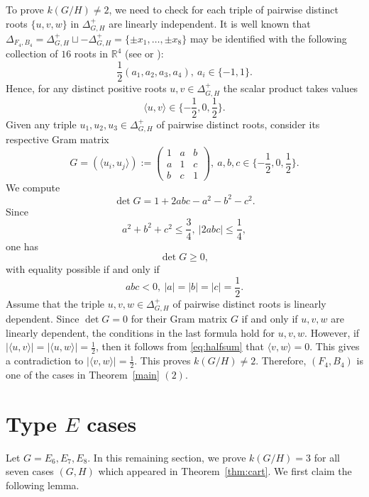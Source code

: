 \documentclass{amsart}
\theoremstyle{definition}
\theoremstyle{remark}
\numberwithin{equation}{section}
\newcommand{\R}{{\mathbb{R}}}
\newcommand{\lb}{\lbrace}
\newcommand{\rb}{\rbrace}
\newcommand{\la}{\langle}
\newcommand{\ra}{\rangle}
\begin{document}
To prove $k(G/H)\not=2$, we need to check for each triple of pairwise distinct roots $\{u,v,w\}$ in $\Delta_{G,H}^{+}$ are linearly independent. 
It is well known that 
$\Delta_{F_{4},B_{4}}=\Delta_{G,H}^{+}\sqcup -\Delta_{G,H}^{+}=\{\pm x_{1},\ldots, \pm x_{8}\}$
may be identified with  
the following collection of $16$ roots in $\R^{4}$ 
(see \cite[p59]{Y25} or \cite{B}):
\begin{equation}\label{eq:halfsum}
\frac{1}{2}(a_{1},a_{2},a_{3},a_{4}),\ a_{i}\in\lb -1,1\rb.
\end{equation}
Hence, for any 
distinct positive
roots $u,v\in \Delta_{G,H}^{+}$ the scalar product takes values
\[
\la u,v\ra\in\lb -\frac{1}{2},0,\frac{1}{2}\rb.
\]
Given any triple $u_{1}, u_{2}, u_{3}\in \Delta_{G,H}^{+}$ of pairwise distinct roots, consider its respective Gram matrix
\[
G=(\la u_{i}, u_{j}\ra):=
\begin{pmatrix}
1 & a & b\\
a & 1 & c\\
b & c & 1
\end{pmatrix},\ 
a,b,c\in\lb -\frac{1}{2},0,\frac{1}{2}\rb.
\]
We compute
\[
\det G=1+2abc-a^2-b^2-c^2.
\]
Since
\[
a^2+b^2+c^2\leq \frac{3}{4},\ |2abc|\leq \frac{1}{4},
\]
one has 
\[
\det G\geq 0,
\]
with equality possible if and only if
\[
abc<0,\ |a|=|b|=|c|=\frac{1}{2}.
\]
Assume that the triple $u,v,w\in \Delta^{+}_{G,H}$ of pairwise distinct roots is linearly dependent.
Since $\det G=0$ for their Gram matrix $G$ if and only if $u,v,w$ are linearly dependent, the conditions in the last formula hold for $u,v,w$.
However, if $|\la u, v\ra|=|\la u, w\ra|=\frac{1}{2}$, then it follows from \eqref{eq:halfsum} that $\la v, w\ra=0$.
This gives a contradiction to $|\la v, w\ra|=\frac{1}{2}$.
This proves $k(G/H)\not=2$. Therefore, $(F_{4},B_{4})$ is one of the cases in Theorem~\ref{main} $(2)$.


\section{Type $E$ cases}
\label{sect:9}

Let $G=E_{6},E_{7},E_{8}$. 
In this remaining section, we prove $k(G/H)=3$ for all seven cases $(G,H)$ which appeared in Theorem~\ref{thm:cart}. We first claim the following lemma.
\end{document}
